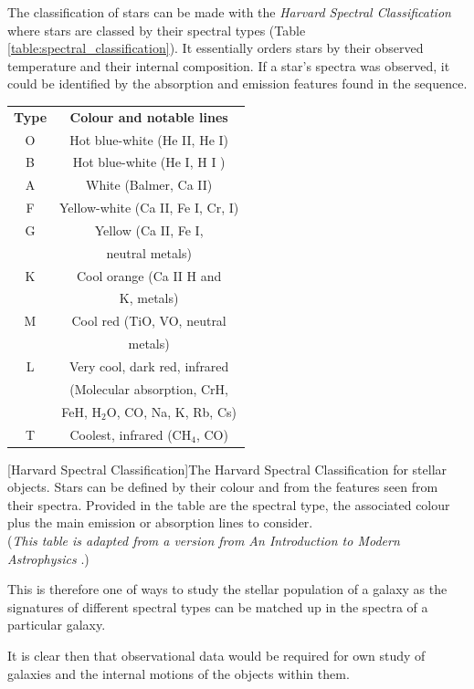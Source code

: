 \documentclass[12pt, twocolumn]{revtex4}    %
\begin{document}
The classification of stars can be made with the \textit{Harvard Spectral Classification} where stars are classed by their spectral types (Table \ref{table:spectral_classification}). It essentially orders stars by their observed temperature and their internal composition. If a star's spectra was observed, it could be identified by the absorption and emission features found in the sequence.    
\begin{center}
\begin{tabular}{c@{\hskip 20pt}c} 
 \hline
 \textbf{Type} & \textbf{Colour and notable lines} \\ [0.5ex] 
 O & Hot blue-white (He II, He I) \\
 B & Hot blue-white (He I, H I ) \\
 A & White (Balmer, Ca II) \\
 F & Yellow-white (Ca II, Fe I, Cr, I) \\
 G & Yellow (Ca II, Fe I,  \\
  & neutral metals) \\
 K & Cool orange (Ca II H and \\ 
  & K, metals) \\
 M & Cool red (TiO, VO, neutral \\
  & metals) \\
 L & Very cool, dark red, infrared \\
  & (Molecular absorption, CrH, \\
  & FeH, H$_2$O, CO, Na, K, Rb, Cs) \\
 T & Coolest, infrared (CH$_4$, CO) \\
 \hline
\end{tabular}
[Harvard Spectral Classification]{The Harvard Spectral Classification for stellar objects. Stars can be defined by their colour and from the features seen from their spectra. Provided in the table are the spectral type, the associated colour plus the main emission or absorption lines to consider. \\
(\textit{This table is adapted from a version from An Introduction to Modern Astrophysics} \cite{carroll_astro}.)}
\label{table:spectral_classification}
\end{center}

This is therefore one of ways to study the stellar population of a galaxy as the signatures of different spectral types can be matched up in the spectra of a particular galaxy. 

It is clear then that observational data would be required for own study of galaxies and the internal motions of the objects within them. 
\end{document}

